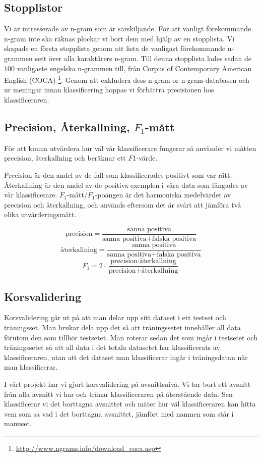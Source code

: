 \documentclass[a4paper]{article}
\begin{document}
\subsection{Stopplistor}
Vi är intresserade av n-gram som är särskiljande. För att vanligt
förekommande n-gram inte ska räknas plockar vi bort dem med hjälp av
en stopplista. Vi skapade en första stopplista genom att lista de
vanligast förekommande n-grammen sett över alla karaktärers n-gram.
Till denna stopplista lades sedan de 100 vanligaste engelska n-grammen
till, från Corpus of Contemporary American English (COCA)
\footnote{\url{http://www.ngrams.info/download_coca.asp}}. Genom att
exkludera dess n-gram or n-gram-databasen och ur meningar innan
klassificering hoppas vi förbättra precisionen hos klassificeraren.


\subsection{Precision, Återkallning, $F_1$-mått}
För att kunna utvärdera hur väl vår klassificerare fungerar så använder vi
måtten precision, återkallning och beräknar ett $F1$-värde.

Precision är den andel av de fall som klassificerades positivt som var rätt.
Återkallning är den andel av de positiva exemplen i våra data som fångades av
vår klassificerare.
$F_1$-mått/$F_1$-poängen är det harmoniska medelvärdet av precision och
återkallning, och används eftersom det är svårt att jämföra två olika
utvärderingsmått.

\[\mathrm{precision}=\dfrac{\text{sanna positiva}}{\text{sanna positiva} + \text{falska positiva}}\]
\[\text{återkallning}=\dfrac{\text{sanna positiva}}{\text{sanna positiva} + \text{falska positiva}}\]
\[F_1 = 2 \cdot \dfrac{\text{precision} \cdot \text{återkallning}}{\text{precision} + \text{återkallning}}\]

\subsection{Korsvalidering}
Korsvalidering går ut på att man delar upp sitt dataset i ett testset och
träningsset. Man brukar dela upp det så att träningssetet innehåller all data
förutom den som tillhör testsetet. Man roterar sedan det som ingår i testsetet
och träningssetet så att all data i det totala datasetet har klassificerats av
klassificeraren, utan att det dataset man klassificerar ingår i träningsdatan
när man klassificerar.

I vårt projekt har vi gjort korsvalidering på avsnittsnivå. Vi tar bort ett
avsnitt från alla avsnitt vi har och tränar klassificeraren på återstående data.
Sen klassificerar vi det borttagna avsnittet och mäter hur väl klassificeraren
kan hitta vem som sa vad i det borttagna avsnittet, jämfört med namnen som står
i manuset.
\end{document}
